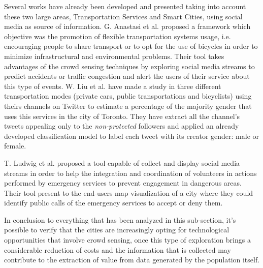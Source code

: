 Several works have already been developed and presented taking into account these two large areas, Transportation Services and Smart Cities, using social media as source of information.
G. Anastasi et al. \cite{kn:Anastasi2013} proposed a framework which objective was the promotion of flexible transportation systems usage, i.e. encouraging people to share transport or to opt for the use of bicycles in order to minimize infrastructural and environmental problems. Their tool takes advantages of the crowd sensing techniques by exploring social media streams to predict accidents or traffic congestion and alert the users of their service about this type of events.
W. Liu et al. \cite{kn:Liu2012} have made a study in three different transportation modes (private cars, public transportations and bicyclists) using theirs channels on Twitter to estimate a percentage of the majority gender that uses this services in the city of Toronto. They have extract all the channel's tweets appealing only to the \textit{non-protected} followers and applied an already developed classification model to label each tweet with its creator gender: male or female.

T. Ludwig et al. \cite{kn:Ludwig2015} proposed a tool capable of collect and display social media streams in order to help the integration and coordination of volunteers in actions performed by emergency services to prevent engagement in dangerous areas. Their tool present to the end-users map visualization of a city where they could identify public calls of the emergency services to accept or deny them.

In conclusion to everything that has been analyzed in this sub-section, it's possible to verify that the cities are increasingly opting for technological opportunities that involve crowd sensing, once this type of exploration brings a considerable reduction of costs and the information that is collected may contribute to the extraction of value from data generated by the population itself.


